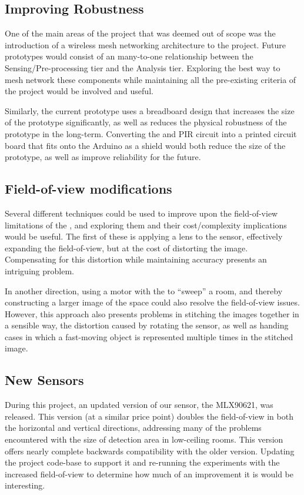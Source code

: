 \documentclass[../thesis/thesis.tex]{subfiles}
\begin{document}
\subsection{Improving Robustness}
One of the main areas of the project that was deemed out of scope was the introduction of a wireless mesh networking architecture to the project. Future prototypes would consist of an many-to-one relationship between the Sensing/Pre-processing tier and the Analysis tier. Exploring the best way to mesh network these components while maintaining all the pre-existing criteria of the project would be involved and useful.

Similarly, the current prototype uses a breadboard design that increases the size of the prototype significantly, as well as reduces the physical robustness of the prototype in the long-term. Converting the \mlx and PIR circuit into a printed circuit board that fits onto the Arduino as a shield would both reduce the size of the prototype, as well as improve reliability for the future.

\subsection{Field-of-view modifications}
Several different techniques could be used to improve upon the field-of-view limitations of the \mlx, and exploring them and their cost/complexity implications would be useful. The first of these is applying a lens to the sensor, effectively expanding the field-of-view, but at the cost of distorting the image. Compensating for this distortion while maintaining accuracy presents an intriguing problem.

In another direction, using a motor with the \mlx to ``sweep'' a room, and thereby constructing a larger image of the space could also resolve the field-of-view issues. However, this approach also presents problems in stitching the images together in a sensible way, the distortion caused by rotating the sensor, as well as handing cases in which a fast-moving object is represented multiple times in the stitched image.

\subsection{New Sensors}
During this project, an updated version of our sensor, the MLX90621, was released. This version (at a similar price point) doubles the field-of-view in both the horizontal and vertical directions, addressing many of the problems encountered with the size of detection area in low-ceiling rooms. This version offers nearly complete backwards compatibility with the older version. Updating the project code-base to support it and re-running the experiments with the increased field-of-view to determine how much of an improvement it is would be interesting.
\end{document}
